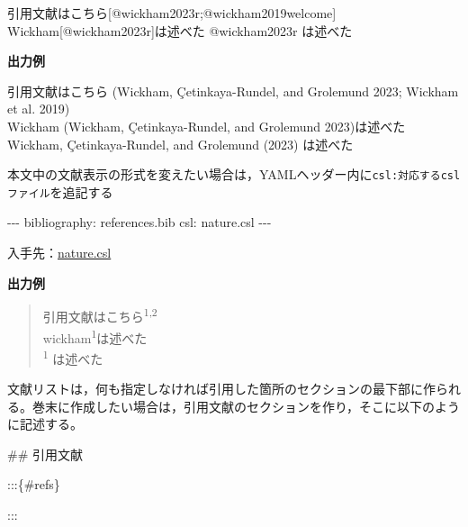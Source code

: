 \documentclass[
  b5paper,
  xelatex, ja=standard]{bxjsbook}
\newenvironment{Shaded}{\begin{snugshade}}{\end{snugshade}}
\newcommand{\AttributeTok}[1]{\textcolor[rgb]{0.40,0.45,0.13}{#1}}
\newcommand{\CommentTok}[1]{\textcolor[rgb]{0.37,0.37,0.37}{#1}}
\newcommand{\FunctionTok}[1]{\textcolor[rgb]{0.28,0.35,0.67}{#1}}
\newcommand{\KeywordTok}[1]{\textcolor[rgb]{0.00,0.23,0.31}{#1}}
\newcommand{\NormalTok}[1]{\textcolor[rgb]{0.00,0.23,0.31}{#1}}
\newcommand{\OtherTok}[1]{\textcolor[rgb]{0.00,0.23,0.31}{#1}}
\newcommand{\PreprocessorTok}[1]{\textcolor[rgb]{0.68,0.00,0.00}{#1}}
\begin{document}
\begin{Shaded}
\begin{Highlighting}[]
\NormalTok{引用文献はこちら}\CommentTok{[}\OtherTok{@wickham2023r;@wickham2019welcome}\CommentTok{]}  
\NormalTok{Wickham}\CommentTok{[}\OtherTok{@wickham2023r}\CommentTok{]}\NormalTok{は述べた  }
\NormalTok{@wickham2023r は述べた  }
\end{Highlighting}
\end{Shaded}

\textbf{出力例}

引用文献はこちら (Wickham, Çetinkaya-Rundel, and Grolemund 2023; Wickham
et al. 2019)\\
Wickham (Wickham, Çetinkaya-Rundel, and Grolemund 2023)は述べた\\
Wickham, Çetinkaya-Rundel, and Grolemund (2023) は述べた

本文中の文献表示の形式を変えたい場合は，YAMLヘッダー内に\texttt{csl:対応するcslファイル}を追記する

\begin{Shaded}
\begin{Highlighting}[]
\PreprocessorTok{{-}{-}{-}}
\FunctionTok{bibliography}\KeywordTok{:}\AttributeTok{ references.bib}
\FunctionTok{csl}\KeywordTok{:}\AttributeTok{ nature.csl}
\PreprocessorTok{{-}{-}{-}}
\end{Highlighting}
\end{Shaded}

入手先：\href{https://github.com/citation-style-language/styles/blob/master/nature.csl}{nature.csl}

\textbf{出力例}

\begin{quote}
引用文献はこちら\textsuperscript{1,2}\\
wickham\textsuperscript{1}は述べた\\
\textsuperscript{1} は述べた
\end{quote}

文献リストは，何も指定しなければ引用した箇所のセクションの最下部に作られる。巻末に作成したい場合は，引用文献のセクションを作り，そこに以下のように記述する。

\begin{Shaded}
\begin{Highlighting}[]
\FunctionTok{\#\# 引用文献}

\NormalTok{:::\{\#refs\}}

\NormalTok{:::}
\end{Highlighting}
\end{Shaded}
\end{document}
